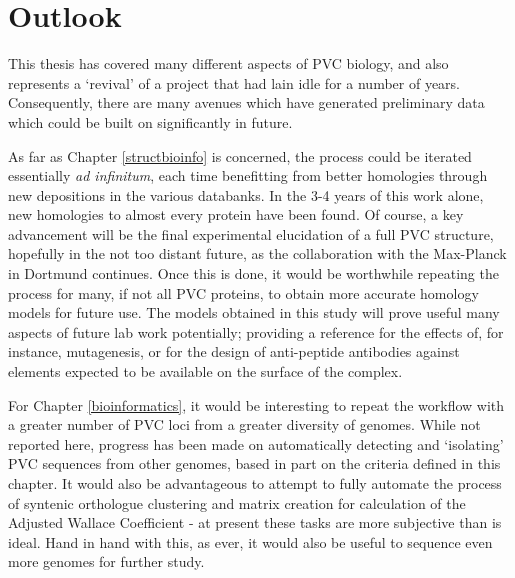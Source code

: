 \chapter{Outlook}\label{outlook}

This thesis has covered many different aspects of PVC biology, and also represents a `revival' of a project that had lain idle for a number of years. Consequently, there are many avenues which have generated preliminary data which could be built on significantly in future.

As far as Chapter \ref{structbioinfo} is concerned, the process could be iterated essentially \emph{ad infinitum}, each time benefitting from better homologies through new depositions in the various databanks. In the 3-4 years of this work alone, new homologies to almost every protein have been found. Of course, a key advancement will be the final experimental elucidation of a full PVC structure, hopefully in the not too distant future, as the collaboration with the Max-Planck in Dortmund continues. Once this is done, it would be worthwhile repeating the process for many, if not all PVC proteins, to obtain more accurate homology models for future use. The models obtained in this study will prove useful many aspects of future lab work potentially; providing a reference for the effects of, for instance, mutagenesis, or for the design of anti-peptide antibodies against elements expected to be available on the surface of the complex.

For Chapter \ref{bioinformatics}, it would be interesting to repeat the workflow with a greater number of PVC loci from a greater diversity of genomes. While not reported here, progress has been made on automatically detecting and `isolating' PVC sequences from other genomes, based in part on the criteria defined in this chapter. It would also be advantageous to attempt to fully automate the process of syntenic orthologue clustering and matrix creation for calculation of the Adjusted Wallace Coefficient - at present these tasks are more subjective than is ideal. Hand in hand with this, as ever, it would also be useful to sequence even more genomes for further study.

